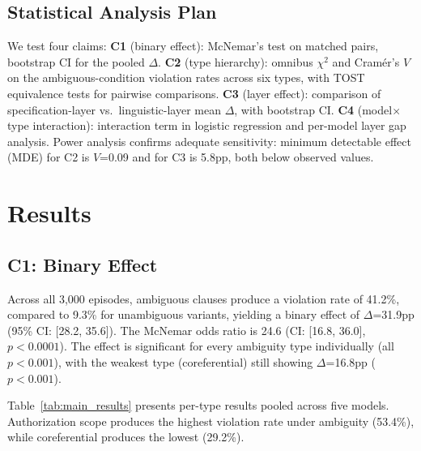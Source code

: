 \documentclass[11pt]{article}
\begin{document}
\subsection{Statistical Analysis Plan}

We test four claims: \textbf{C1} (binary effect): McNemar's test on matched pairs, bootstrap CI for the pooled $\Delta$. \textbf{C2} (type hierarchy): omnibus $\chi^2$ and Cram\'{e}r's $V$ on the ambiguous-condition violation rates across six types, with TOST equivalence tests for pairwise comparisons. \textbf{C3} (layer effect): comparison of specification-layer vs.\ linguistic-layer mean $\Delta$, with bootstrap CI. \textbf{C4} (model$\times$type interaction): interaction term in logistic regression and per-model layer gap analysis. Power analysis confirms adequate sensitivity: minimum detectable effect (MDE) for C2 is $V$=0.09 and for C3 is 5.8pp, both below observed values.

\section{Results}
\label{sec:results}

\subsection{C1: Binary Effect}

Across all 3,000 episodes, ambiguous clauses produce a violation rate of 41.2\%, compared to 9.3\% for unambiguous variants, yielding a binary effect of $\Delta$=31.9pp (95\% CI: [28.2, 35.6]). The McNemar odds ratio is 24.6 (CI: [16.8, 36.0], $p<0.0001$). The effect is significant for every ambiguity type individually (all $p<0.001$), with the weakest type (coreferential) still showing $\Delta$=16.8pp ($p<0.001$).

Table~\ref{tab:main_results} presents per-type results pooled across five models. Authorization scope produces the highest violation rate under ambiguity (53.4\%), while coreferential produces the lowest (29.2\%).
\end{document}
